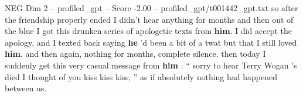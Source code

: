 \begin{textsample}{NEG Dim 2 – profiled\_gpt – Score -2.00 – profiled\_gpt/t001442\_gpt.txt}  \label{ex:f2_neg_038}
so after the friendship properly ended I didn't hear anything for months and then out of the blue I got this drunken series of apologetic texts from \textbf{him}.
I did accept the apology, and I texted back saying \textbf{he} ’d been a bit of a twat but that I still loved \textbf{him}. and then again, nothing for months, complete silence. then today I suddenly get this very casual message from \textbf{him} : “ sorry to hear Terry Wogan ’s died I thought of you kiss kiss kiss, ” as if absolutely nothing had happened between us.

\end{textsample}
